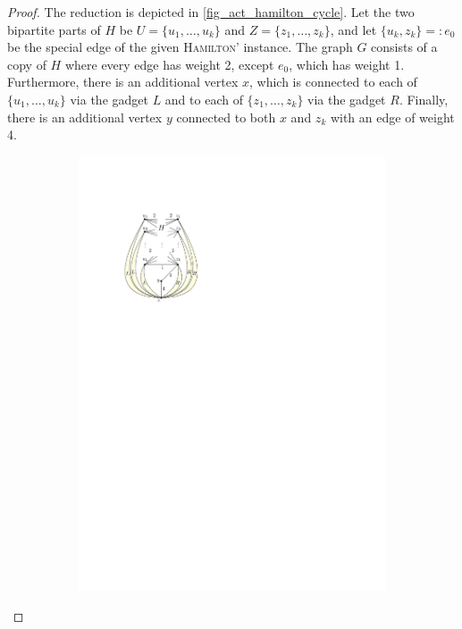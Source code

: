 \documentclass[runningheads]{llncs}
\newcommand{\set}[1]{\{ #1 \}}
\newcommand{\fromto}[2]{\set{#1, \ldots, #2}}
\begin{document}
\begin{proof}
The reduction is depicted in \cref{fig_act_hamilton_cycle}. Let the two bipartite parts of $H$ be $U = \fromto{u_1}{u_k}$ and $Z = \fromto{z_1}{z_k}$, and let $\set{u_k, z_k} =: e_0$ be the special edge of the given \textsc{Hamilton'} instance. The graph $G$ consists of a copy of $H$ where every edge has weight 2, except $e_0$, which has weight 1. Furthermore, there is an additional vertex $x$, which is connected to each of $\fromto{u_1}{u_k}$ via the gadget $L$ and to each of $\fromto{z_1}{z_k}$ via the gadget $R$. Finally, there is an additional vertex $y$ connected to both $x$ and $z_k$ with an edge of weight 4.
\begin{figure}[htpb]
     \centering
     \begin{subfigure}[b]{0.40\textwidth}
         \centering
         \includegraphics[scale=0.90]{img/act-hamilton-cycle-a}
     \end{subfigure}

\end{figure}
\end{proof}
\end{document}
